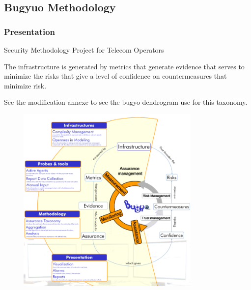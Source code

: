 \documentclass[12pt]{report}
\begin{document}
\begin{multicols}{2}


\subsection*{Bugyuo Methodology}

\vspace{\baselineskip}
\subsubsection*{Presentation}
\begin{justify}
Security Methodology Project for Telecom Operators
\end{justify}\par

\begin{justify}
The infrastructure is generated by metrics that generate evidence that serves to minimize the risks that give a level of confidence on countermeasures that minimize risk.
\end{justify}\par

\begin{justify}
See the modification annexe to see the bugyo dendrogram use for this taxonomy.
\end{justify}\par


\begin{figure}[H]	\includegraphics[width=3.54in,height=3.65in]{./media/image6.png}
\end{figure}




\end{multicols}
\end{document}
